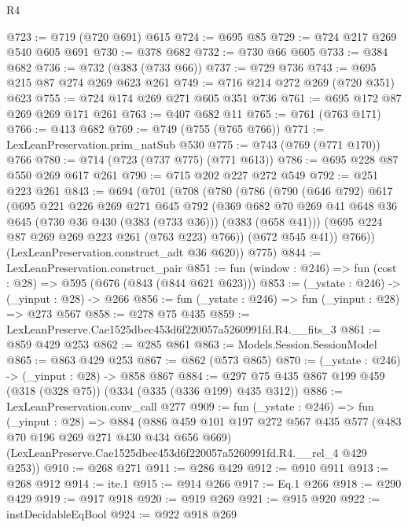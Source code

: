 \begin{lexlean}{R4}
\begin{coremodule}
@723 := @719 (@720 @691) @615
@724 := @695 @85
@729 := @724 @217 @269 @540 @605 @691
@730 := @378 @682
@732 := @730 @66 @605
@733 := @384 @682
@736 := @732 (@383 (@733 @66))
@737 := @729 @736
@743 := @695 @215 @87 @274 @269 @623 @261
@749 := @716 @214 @272 @269 (@720 @351) @623
@755 := @724 @174 @269 @271 @605 @351 @736
@761 := @695 @172 @87 @269 @269 @171 @261
@763 := @407 @682 @11
@765 := @761 (@763 @171)
@766 := @413 @682
@769 := @749 (@755 (@765 @766))
@771 := LexLeanPreservation.prim_natSub @530
@775 := @743 (@769 (@771 @170)) @766
@780 := @714 (@723 (@737 @775) (@771 @613))
@786 := @695 @228 @87 @550 @269 @617 @261
@790 := @715 @202 @227 @272 @549
@792 := @251 @223 @261
@843 := @694
    (@701
      (@708
        (@780
          (@786
            (@790
              (@646 @792)
              @617
              (@695
                @221
                @226
                @269
                @271
                @645
                @792
                (@369
                  @682
                  @70
                  @269
                  @41
                  @648
                  @36
                  @645
                  (@730 @36 @430 (@383 (@733 @36)))
                  (@383 (@658 @41)))
                (@695 @224 @87 @269 @269 @223 @261 (@763 @223) @766))
              (@672 @545 @41))
            @766))
        (LexLeanPreservation.construct_adt @36 @620))
      @775)
@844 := LexLeanPreservation.construct_pair
@851 := fun (window : @246) => fun (cost : @28) => @595 (@676 (@843 (@844 @621 @623)))
@853 := (_ystate : @246) -> (_yinput : @28) -> @266
@856 := fun (_ystate : @246) => fun (_yinput : @28) => @273 @567
@858 := @278 @75 @435
@859 := LexLeanPreserve.Cae1525dbec453d6f220057a5260991fd.R4.__fits_3
@861 := @859 @429 @253
@862 := @285 @861
@863 := Models.Session.SessionModel
@865 := @863 @429 @253
@867 := @862 (@573 @865)
@870 := (_ystate : @246) -> (_yinput : @28) -> @858 @867
@884 := @297 @75 @435 @867 @199 @459 (@318 (@328 @75)) (@334 (@335 (@336 @199) @435 @312))
@886 := LexLeanPreservation.conv_call @277
@909 := fun (_ystate : @246) =>
  fun (_yinput : @28) =>
  @884
    (@886
      @459
      @101
      @197
      @272
      @567
      @435
      @577
      (@483 @70 @196 @269 @271 @430 @434 @656 @669)
      (LexLeanPreserve.Cae1525dbec453d6f220057a5260991fd.R4.__rel_4 @429 @253))
@910 := @268 @271
@911 := @286 @429
@912 := @910 @911
@913 := @268 @912
@914 := ite.{1}
@915 := @914 @266
@917 := Eq.{1} @266
@918 := @290 @429
@919 := @917 @918
@920 := @919 @269
@921 := @915 @920
@922 := instDecidableEqBool
@924 := @922 @918 @269

\end{coremodule}
\end{lexlean}

